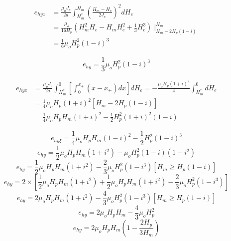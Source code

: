 \begin{align*}%
e_{hyx}&=\frac{\mu_oJ_c}{2a}\int_{H_{m}^{*}}^{H_m}\left(\frac{H_m-H_e}{2J_c}\right)^2dH_e \\
&=\frac{\mu_o}{16H_p}(H_{m}^{2}H_e-H_mH_{e}^{2}+\frac{1}{3}H_{e}^{3})\mid_{H_m-2H_p(1-i)}^{H_m} \\
&=\frac{1}{6}\mu_oH_{p}^{2}(1-i)^3
\end{align*}

\begin{equation}%
e_{hy}=\frac{1}{3}\mu_oH_{p}^{2}(1-i)^3
\end{equation}

\begin{align*}%
e_{hyx}&=\frac{\mu_oJ_c}{2a}\int_{H_{m}^{*}}^{0}\left[\int_{0}^{x_+}(x-x_+)dx\right]dH_e=-\frac{\mu_oH_p(1+i)^2}{4}\int_{H_{m}^{*}}^{0}dH_e \\
&=\frac{1}{4}\mu_oH_p(1+i)^2[H_m-2H_p(1-i)] \\
&=\frac{1}{4}\mu_oH_pH_m(1+i)^2-\frac{1}{2}H_{p}^{2}(1+i)^2(1-i)
\end{align*}

\begin{equation}%
e_{hy\xi}=\frac{1}{4}\mu_oH_pH_m(1-i)^2-\frac{1}{2}H_{p}^{2}(1-i)^3
\end{equation}
\begin{equation}%
e_{hy}=\frac{1}{2}\mu_oH_pH_m(1+i^2)-\mu_oH_{p}^{2}(1-i)(1+i^2)
\end{equation}
\begin{equation}%
e_{hy}=\frac{1}{2}\mu_oH_pH_m(1+i^2)-\frac{2}{3}\mu_oH_{p}^{2}(1-i^3)     [H_m\geq H_p(1-i)]
\end{equation}
\begin{equation}%
e_{hy}=2\times\left[\frac{1}{2}\mu_oH_pH_m(1+i^2)+\frac{1}{2}\mu_oH_pH_m(1+i^2)-\frac{2}{3}\mu_oH_{p}^{2}(1-i^3)\right]
\end{equation}
\begin{equation}%
e_{hy}=2\mu_oH_pH_m(1+i^2)-\frac{4}{3}\mu_oH_{p}^{2}(1-i^3)     [H_m\geq H_p(1-i)]
\end{equation}
\begin{equation}%
e_{hy}=2\mu_oH_pH_m-\frac{4}{3}\mu_oH_{p}^{2}
\end{equation}
\begin{equation}%
e_{hy}=2\mu_oH_pH_m\left(1-\frac{2H_p}{3H_m}\right)
\end{equation}


